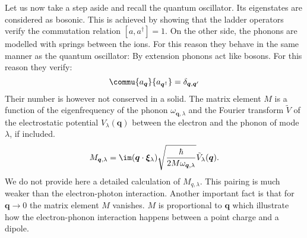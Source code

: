 \documentclass[../main.tex]{subfile}
\begin{document}
Let us now take a step aside and recall the quantum oscillator. Its eigenstates are considered as bosonic. This is achieved by showing that the ladder operators
verify the commutation relation $[a,a^{\dagger}] = 1$. On the other side, the phonons are modelled with springs between the ions. For this reason they
behave in the same manner as the quantum oscillator: By extension phonons act like bosons. For this reason they verify:
\[
    \commu{a_{\bm{q}}}{a_{\bm{q}^{\dagger}}} = \delta_{\bm{q},\bm{q}'}
\] 
Their number is however not conserved in a solid. The matrix element $M$ is a function of the eigenfrequency 
of the phonon $\omega_{\bm{q},\lambda}$ and the Fourier transform $\tilde{V}$ of the electrostatic potential $V_{\lambda}(\bm{q})$ between the electron
and the phonon of mode $\lambda$, if included.
\[
    M_{\bm{q},\lambda} = \im (\bm{q}\cdot \bm{\xi}_{\lambda}) \sqrt{\frac{\hbar}{2M\omega_{\bm{q},\lambda}}} \tilde{V}_{\lambda}(\bm{q}).
\]
We do not provide here a detailed calculation of $M_{q,\lambda}$. This pairing is much weaker than the electron-photon interaction. 
Another important fact is that for $\bm{q}\rightarrow 0$ the matrix element $M$ vanishes. $M$ is proportional to $\bm{q}$ which illustrate how the electron-phonon interaction
happens between a point charge and a dipole.\\
\end{document}
